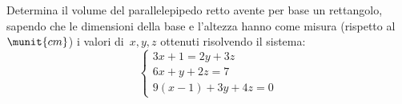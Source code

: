 \begin{esercizio}
 \label{ese:22.63}
Determina il volume del parallelepipedo retto avente
per base un rettangolo, sapendo che le dimensioni della base e
l'altezza hanno come misura (rispetto al~\(\munit{cm}\)) i valori
di~\(x, y, z\) ottenuti risolvendo il sistema:
\[\left\{\begin{array}{l}3x+1=2y+3z \\6x+y+2z=7
\\9(x-1)+3y+4z=0 \end{array}\right.\]
\end{esercizio}


% 
% 
% 
% 
% 
